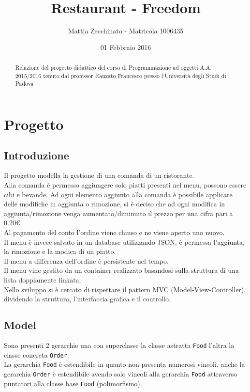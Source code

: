 \documentclass[]{report}   %
\begin{document}
\title{Restaurant - Freedom}  	 %
\author{Mattia Zecchinato - Matricola 1006435}    	 %
\date{01 Febbraio 2016}   		 %
\maketitle

\begin{abstract}
  Relazione del progetto didattico del corso di Programmazione ad oggetti A.A. 2015/2016 tenuto dal professor Ranzato Francesco presso l'Università degli Studi di Padova
\end{abstract}

\chapter{Progetto}         				%
\section{Introduzione}     				%
Il progetto modella la gestione di una comanda di un ristorante.\\
Alla comanda è permesso aggiungere solo piatti presenti nel menu, possono essere cibi e bevande. Ad ogni elemento aggiunto alla comanda è possibile applicare delle modifiche in aggiunta o rimozione, si è deciso che ad ogni modifica in aggiunta/rimozione venga aumentato/diminuito il prezzo per una cifra pari a 0.20€.\\
Al pagamento del conto l'ordine viene chiuso e ne viene aperto uno nuovo.\\
Il menu è invece salvato in un database utilizzando JSON, è permessa l'aggiunta, la rimozione e la modica di un piatto.\\
Il menu a differenza dell'ordine è persistente nel tempo.\\
Il menu vine gestito da un container realizzato basandosi sulla struttura di una lista doppiamente linkata.\\
Nello sviluppo si è cercato di rispettare il pattern MVC (Model-View-Controller), dividendo la struttura, l'interfaccia grafica e il controllo.

\section{Model}     					%
Sono presenti 2 gerarchie una con superclasse la classe astratta \texttt{Food} l'altra la classe concreta \texttt{Order}.\\
La gerarchia \texttt{Food} è estendibile in quanto non presenta numerosi vincoli, anche la gerarchia \texttt{Order} è estendibile avendo solo vincoli alla gerarchia \texttt{Food} attraverso puntatori alla classe base \texttt{Food} (polimorfismo).
\end{document}
